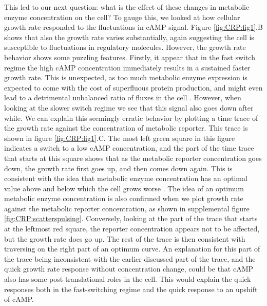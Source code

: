 This led to our next question: what is the effect of these changes in metabolic enzyme concentration on the cell? 
%
To gauge this, we looked at how cellular growth rate responded to the fluctuations in cAMP signal. 
%
Figure \ref{fig:CRP:fig1}.B shows that also the growth rate varies substantially, again suggesting the cell is susceptible to fluctuations in regulatory molecules. 
%
However, the growth rate behavior shows some puzzling features. 
%
Firstly, it appear that in the fast switch regime the high cAMP concentration immediately results in a sustained faster growth rate.
This is unexpected, as too much metabolic enzyme expression is expected to come with the cost of superfluous protein production, and might even lead to a detrimental unbalanced ratio of fluxes in the cell \cite{Ray2016}.
%
However, when looking at the slower switch regime we see that this signal also goes down after while. 
%
We can explain this seemingly erratic behavior by plotting a time trace of the growth rate against the concentration of metabolic reporter.
%
This trace is shown in figure \ref{fig:CRP:fig1}.C. 
%
The most left green square in this figure indicates a switch to a low cAMP concentration, and the part of the time trace that starts at this square shows that as the metabolic reporter concentration goes down, the growth rate first goes up, and then comes down again. 
This is consistent with the idea that metabolic enzyme concentration has an optimal value above and below which the cell grows worse \cite{Jensen1993, Dekel2005, Berkhout2013, Ray2016, Towbin2017}.
%
The idea of an optimum metabolic enzyme concentration is also confirmed when we plot growth rate against the metabolic reporter concentration, as shown in supplemental figure \ref{fig:CRP:scatterspulsing}. 
%
Conversely, looking at the part of the trace that starts at the leftmost red square, the reporter concentration appears not to be affected, but the growth rate does go up.
%
The rest of the trace is then consistent with traversing on the right part of an optimum curve.
%
An explanation for this part of the trace being inconsistent with the earlier discussed part of the trace, and the quick growth rate response without concentration change, 
could be that cAMP also has some post-translational roles in the cell. 
This would explain the quick responses both in the fast-switching regime and the quick response to an upshift of cAMP.


